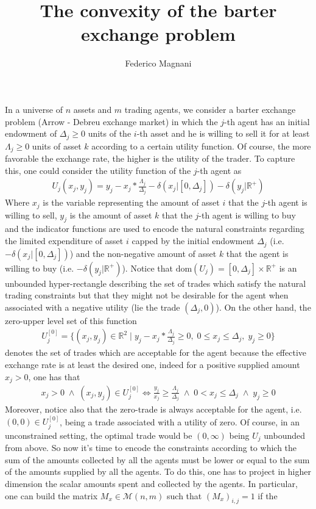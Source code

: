 \documentclass{article}
\begin{document}
\title{The convexity of the barter exchange problem}
\author{Federico Magnani}
\date{}
\maketitle
In a universe of $n$ assets and $m$ trading agents, we consider a barter exchange problem (Arrow - Debreu exchange market) in which the $j$-th agent has an initial endowment of $\Delta_{j}\geq0$ units of the $i$-th asset and he is willing to sell it for at least $\Lambda_{j}\geq0$ units of asset $k$ according to a certain utility function. Of course, the more favorable the exchange rate, the higher is the utility of the trader. To capture this, one could consider the utility function of the $j$-th agent as 
\begin{align*}
    U_j(x_{j}, y_{j}) = y_{j}-x_{j} * \frac{\Lambda_{j}}{\Delta_{j}} - \delta(x_{j}|[0,\Delta_{j}]) - \delta(y_{j}|\mathbb{R}^+)
\end{align*}
Where $x_{j}$ is the variable representing the amount of asset $i$ that the $j$-th agent is willing to sell, $y_{j}$ is the amount of asset $k$ that the $j$-th agent is willing to buy and the indicator functions are used to encode the natural constraints regarding the limited expenditure of asset $i$ capped by the initial endowment $\Delta_{j}$ (i.e. $- \delta(x_{j}|[0,\Delta_{j}])$) and the non-negative amount of asset $k$ that the agent is willing to buy (i.e. $- \delta(y_{j}|\mathbb{R}^+)$). Notice that $\text{dom}(U_j)=[0,\Delta_{j}]\times\mathbb{R}^+$ is an unbounded hyper-rectangle describing the set of trades which satisfy the natural trading constraints but that they might not be desirable for the agent when associated with a negative utility (lie the trade $(\Delta_{j}, 0)$). On the other hand, the zero-upper level set of this function 
\begin{align*}
    U^{[0]}_j = \{ (x_{j}, y_{j}) \in \mathbb{R}^2 \;|\; y_{j}-x_{j} * \frac{\Lambda_{j}}{\Delta_{j}} \geq 0, \;  0\leq x_{j}\leq\Delta_{j},\; y_{j}\geq 0\}
\end{align*}
denotes the set of trades which are acceptable for the agent because the effective exchange rate is at least the desired one, indeed for a positive supplied amount $x_{j}>0$, one has that 
\begin{align*}
    x_{j}>0 \;\land \;(x_{j}, y_{j}) \in U^{[0]}_j \iff \frac{y_{j}}{x_{j}}\geq \frac{\Lambda_{j}}{\Delta_{j}}\;\land \;  0< x_{j}\leq\Delta_{j}\;\land\; y_{j}\geq 0
\end{align*}
Moreover, notice also that the zero-trade is always acceptable for the agent, i.e. $(0,0)\in U^{[0]}_j$, being a trade associated with a utility of zero. Of course, in an unconstrained setting, the optimal trade would be $(0,\infty)$ being $U_j$ unbounded from above. So now it's time to encode the constraints according to which the sum of the amounts collected by all the agents must be lower or equal to the sum of the amounts supplied by all the agents. To do this, one has to project in higher dimension the scalar amounts spent and collected by the agents. In particular, one can build the matrix $M_x\in\mathcal{M}(n,m)$ such that $(M_x)_{i,j}=1$ if the
\end{document}
